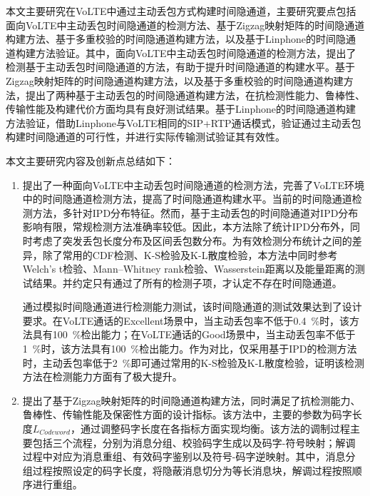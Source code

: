 

\begin{conclusion}

本文主要研究在VoLTE中通过主动丢包方式构建时间隐通道，主要研究要点包括面向VoLTE中主动丢包时间隐通道的检测方法、基于Zigzag映射矩阵的时间隐通道构建方法、基于多重校验的时间隐通道构建方法，以及基于Linphone的时间隐通道构建方法验证。其中，面向VoLTE中主动丢包时间隐通道的检测方法，提出了检测基于主动丢包时间隐通道的方法，有助于提升时间隐通道的构建水平。基于Zigzag映射矩阵的时间隐通道构建方法，以及基于多重校验的时间隐通道构建方法，提出了两种基于主动丢包的时间隐通道构建方法，在抗检测性能力、鲁棒性、传输性能及构建代价方面均具有良好测试结果。基于Linphone的时间隐通道构建方法验证，借助Linphone与VoLTE相同的SIP+RTP通话模式，验证通过主动丢包构建时间隐通道的可行性，并进行实际传输测试验证其有效性。

本文主要研究内容及创新点总结如下：
\begin{enumerate}
    \item
    提出了一种面向VoLTE中主动丢包时间隐通道的检测方法，完善了VoLTE环境中的时间隐通道检测方法，提高了时间隐通道构建水平。当前的时间隐通道检测方法，多针对IPD分布特征。然而，基于主动丢包的时间隐通道对IPD分布影响有限，常规检测方法准确率较低。因此，本方法除了统计IPD分布外，同时考虑了突发丢包长度分布及区间丢包数分布。为有效检测分布统计之间的差异，除了常用的CDF检测、K-S检验及K-L散度检验，本方法中同时参考Welch's t检验、Mann–Whitney rank检验、Wasserstein距离以及能量距离的测试结果。并约定只有通过了所有的检测子项，才认定不存在时间隐通道。
    
    通过模拟时间隐通道进行检测能力测试，该时间隐通道的测试效果达到了设计要求。在VoLTE通话的Excellent场景中，当主动丢包率不低于{0.4\ \%}时，该方法具有{100\ \%}检出能力；在VoLTE通话的Good场景中，当主动丢包率不低于{1\ \%}时，该方法具有{100\ \%}检出能力。作为对比，仅采用基于IPD的检测方法时，主动丢包率低于{2\ \%}即可通过常用的K-S检验及K-L散度检验，证明该检测方法在检测能力方面有了极大提升。
    
    \item
    提出了基于Zigzag映射矩阵的时间隐通道构建方法，同时满足了抗检测能力、鲁棒性、传输性能及保密性方面的设计指标。该方法中，主要的参数为码字长度$L_{Codeword}$，通过调整码字长度在各指标方面实现均衡。该方法的调制过程主要包括三个流程，分别为消息分组、校验码字生成以及码字-符号映射；解调过程中对应为消息重组、有效码字鉴别以及符号-码字逆映射。其中，消息分组过程按照设定的码字长度，将隐蔽消息切分为等长消息块，解调过程按照顺序进行重组。
    

\end{enumerate}
\end{conclusion}
